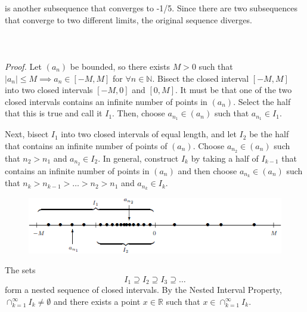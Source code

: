 \documentclass{article}
\begin{document}
                is another subsequence that converges to -1/5. Since there are two subsequences that converge to two different limits, the original sequence diverges.
                \\ \\
                \\ \\
                \textit{Proof.} Let $(a_n)$ be bounded, so there exists $M>0$ such that $|a_n|\leq M \implies a_n \in [-M,M]$ for $\forall n \in \mathbb{N}$. Bisect the closed interval $[-M,M]$ into two closed intervals $[-M,0]$ and $[0,M]$. It must be that one of the two closed intervals contains an infinite number of points in $(a_n)$. Select the half that this is true and call it $I_1$. Then, choose $a_{n_1} \in (a_n)$ such that $a_{n_1} \in I_1$.
                
                Next, bisect $I_1$ into two closed intervals of equal length, and let $I_2$ be the half that contains an infinite number of points of $(a_n)$. Choose $a_{n_2} \in (a_n)$ such that $n_2 > n_1$ and $a_{n_2} \in I_2$. In general, construct $I_k$ by taking a half of $I_{k-1}$ that contains an infinite number of points in $(a_n)$ and then choose $a_{n_k} \in (a_n)$ such that $n_k > n_{k-1} > \dots > n_2 > n_1$ and $a_{n_k} \in I_k$.
                \begin{figure}[ht!]
                    \centering
                    \includegraphics[width=0.8\linewidth]{figs/theorem2.5.5.png}
                    \caption{}
                \end{figure}
                
                The sets
                \begin{equation*}
                    I_1 \supseteq I_2 \supseteq I_3 \supseteq \dots
                \end{equation*}
                form a nested sequence of closed intervals. By the Nested Interval Property, $\cap_{k=1}^\infty I_k \neq \emptyset$ and there exists a point $x \in \mathbb{R}$ such that $x \in \cap_{k=1}^\infty I_k$.
                
\end{document}
